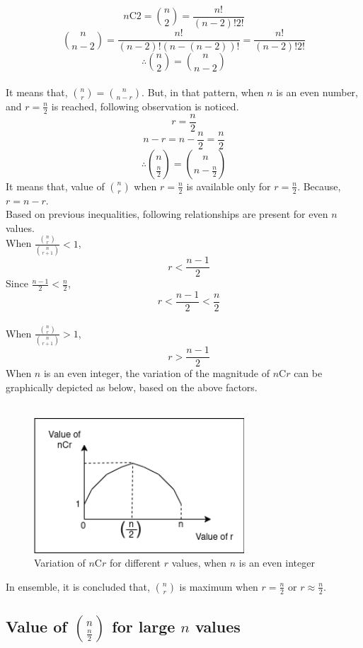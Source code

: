 \[ n \text{C} 2 = \binom{n}{2} = \frac{n!}{(n-2)!2!} \]
\[ \binom{n}{n-2} = \frac{n!}{(n-2)!(n-(n-2))!} = \frac{n!}{(n-2)!2!} \]
\[ \therefore \binom{n}{2} = \binom{n}{n-2} \]\\

It means that, $\binom{n}{r} = \binom{n}{n-r}$. But, in that pattern, when $n$ is an even number, and $r = \frac{n}{2}$ is reached, following observation is noticed.\\
\[ r = \frac{n}{2} \]
\[ n - r = n - \frac{n}{2} = \frac{n}{2} \]
\[ \therefore \binom{n}{\frac{n}{2}} = \binom{n}{n - \frac{n}{2}} \]
It means that, value of $\binom{n}{r}$ when $r = \frac{n}{2}$ is available only for $r = \frac{n}{2}$. Because, $r = n - r$.\\
Based on previous inequalities, following relationships are present for even $n$ values. \\
When $\frac{\binom{n}{r}}{\binom{n}{r+1}} < 1$, 
\[ \quad r < \frac{n-1}{2} \]
Since $\frac{n-1}{2} < \frac{n}{2}$, 
\[ \quad r < \frac{n-1}{2} < \frac{n}{2} \]\\
When $\frac{\binom{n}{r}}{\binom{n}{r+1}} > 1$, 
\[ \quad r > \frac{n-1}{2} \]
When $n$ is an even integer, the variation of the magnitude of $n \text{C} r$ can be graphically depicted as below, based on the above factors.\\ \\
\begin{figure}[H]
    \centering
    \includegraphics[width=0.7\textwidth]{./image/ncr_for_even_n.png}
    \caption{Variation of $n \text{C} r$ for different $r$ values, when $n$ is an even integer}
    \label{fig:Variation of nCr for different r values, when n is an even integer}
\end{figure}
In ensemble, it is concluded that, $\binom{n}{r}$ is maximum when $r = \frac{n}{2}$ or $r \approx \frac{n}{2}$.

\subsection{Value of $\binom{n}{\frac{n}{2}}$ for large $n$ values} \label{proof: time complexity of nc(n/2)}

